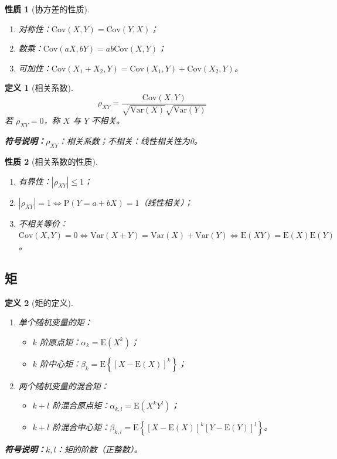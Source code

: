 \documentclass{article}
\newcommand{\Cov}{\mathrm{Cov}}
\newcommand{\E}{\mathrm{E}}
\newcommand{\D}{\mathrm{Var}}
\newcommand{\Prob}{\mathrm{P}}
\newcommand{\symnote}[1]{\par\noindent\textbf{符号说明：}#1\par}
\theoremstyle{mytheorem}
\newtheorem{definition}{定义}[section]
\newtheorem{property}{性质}[section]
\begin{document}
\begin{property}[协方差的性质]
\begin{enumerate}
    \item 对称性：$\Cov(X, Y) = \Cov(Y, X)$；
    \item 数乘：$\Cov(aX, bY) = ab\Cov(X, Y)$；
    \item 可加性：$\Cov(X_1 + X_2, Y) = \Cov(X_1, Y) + \Cov(X_2, Y)$。
\end{enumerate}
\end{property}

\begin{definition}[相关系数]
$$
\rho_{XY} = \frac{\Cov(X,Y)}{\sqrt{\D(X)}\sqrt{\D(Y)}}
$$
若 $\rho_{XY}=0$，称 $X$ 与 $Y$ 不相关。
\symnote{$\rho_{XY}$：相关系数；不相关：线性相关性为0。}
\end{definition}

\begin{property}[相关系数的性质]
\begin{enumerate}
    \item 有界性：$|\rho_{XY}| \le 1$；
    \item $|\rho_{XY}| = 1 \iff \Prob(Y = a + bX) = 1$（线性相关）；
    \item 不相关等价：$\Cov(X,Y)=0 \iff \D(X+Y)=\D(X)+\D(Y) \iff \E(XY)=\E(X)\E(Y)$。
\end{enumerate}
\end{property}

\subsection{矩}
\begin{definition}[矩的定义]
\begin{enumerate}
    \item 单个随机变量的矩：
    \begin{itemize}
        \item $k$ 阶原点矩：$\alpha_k = \E(X^k)$；
        \item $k$ 阶中心矩：$\beta_k = \E\left\{[X-\E(X)]^k\right\}$；
    \end{itemize}
    \item 两个随机变量的混合矩：
    \begin{itemize}
        \item $k+l$ 阶混合原点矩：$\alpha_{k,l} = \E(X^k Y^l)$；
        \item $k+l$ 阶混合中心矩：$\beta_{k,l} = \E\left\{[X-\E(X)]^k [Y-\E(Y)]^l\right\}$。
    \end{itemize}
\end{enumerate}
\symnote{$k,l$：矩的阶数（正整数）。}
\end{definition}
\end{document}
